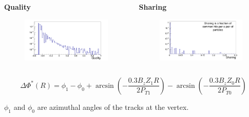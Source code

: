 \documentclass[dvipsnames] {beamer}
\begin{document}
\begin{frame}[shrink=50]
\begin{columns}[c]
    \begin{block}{\bf \centering Quality}
       \begin{figure}[H]
        \includegraphics[width=1.\textwidth]{quality_distr.png}
      \end{figure}
    \end{block}
    \begin{block}{\bf \centering Sharing}
       \begin{figure}[H]
        \includegraphics[width=1.\textwidth]{sharing_distr.png}
      \end{figure}
    \end{block}
  \end{columns}
  \begin{block}{}
    \begin{equation*}
      \Delta \Phi^{*}(R) = \phi_{1} - \phi_{0} + \arcsin \left(-\dfrac{0.3 B_{z} Z_{1} R}{2 P_{T1}}\right) - \arcsin \left(-\dfrac{0.3 B_{z} Z_{0} R}{2 P_{T0}}\right)
    \end{equation*}
        {\footnotesize
          $\phi_{1}$ and $\phi_{0}$ are azimuthal angles of the tracks at the vertex.
          
}
\end{block}
\end{frame}
\end{document}
